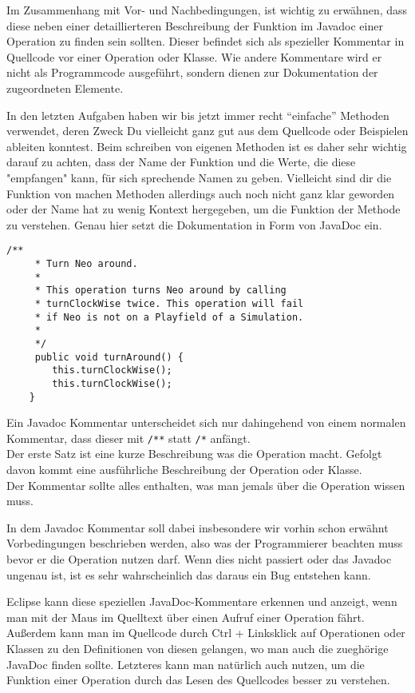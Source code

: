 \begin{Infobox}[Javadoc]
    Im Zusammenhang mit Vor- und Nachbedingungen, ist wichtig zu erwähnen, dass diese neben einer detaillierteren Beschreibung der Funktion im Javadoc einer Operation zu finden sein sollten.
    Dieser befindet sich als spezieller Kommentar in Quellcode vor einer Operation oder Klasse.
    Wie andere Kommentare wird er nicht als Programmcode ausgeführt, sondern dienen zur Dokumentation der zugeordneten Elemente.

    In den letzten Aufgaben haben wir bis jetzt immer recht \enquote{einfache} Methoden verwendet, deren Zweck Du vielleicht ganz gut aus dem Quellcode oder Beispielen ableiten konntest.
    Beim schreiben von eigenen Methoden ist es daher sehr wichtig darauf zu achten, dass der Name der Funktion und die Werte, die diese "empfangen" kann, für sich sprechende Namen zu geben.
    Vielleicht sind dir die Funktion von machen Methoden allerdings auch noch nicht ganz klar geworden oder der Name hat zu wenig Kontext hergegeben, um die Funktion der Methode
zu verstehen.
    Genau hier setzt die Dokumentation in Form von JavaDoc ein.

    \begin{lstlisting}[numbers=none]
    /**
     * Turn Neo around.
     *
     * This operation turns Neo around by calling
     * turnClockWise twice. This operation will fail 
     * if Neo is not on a Playfield of a Simulation.
     *
     */
     public void turnAround() {
        this.turnClockWise();
        this.turnClockWise();
    }
    \end{lstlisting}

    Ein Javadoc Kommentar unterscheidet sich nur dahingehend von einem normalen Kommentar, dass dieser mit \lstinline{/**} statt \lstinline{/*} anfängt.\\
    
    Der erste Satz ist eine kurze Beschreibung was die Operation macht.
    Gefolgt davon kommt eine ausführliche Beschreibung der Operation oder Klasse.\\

    Der Kommentar sollte alles enthalten, was man jemals über die Operation wissen muss.

    In dem Javadoc Kommentar soll dabei insbesondere wir vorhin schon erwähnt Vorbedingungen beschrieben werden, also was der Programmierer beachten muss bevor er die Operation nutzen darf.
    Wenn dies nicht passiert oder das Javadoc ungenau ist, ist es sehr wahrscheinlich das daraus ein Bug entstehen kann.

    Eclipse kann diese speziellen JavaDoc-Kommentare erkennen und anzeigt, wenn man mit der Maus im Quelltext über einen Aufruf einer Operation fährt.
    Außerdem kann man im Quellcode durch Ctrl + Linksklick auf Operationen oder Klassen zu den Definitionen von diesen gelangen, wo man auch die zueghörige JavaDoc finden sollte.
    Letzteres kann man natürlich auch nutzen, um die Funktion einer Operation durch das Lesen des Quellcodes besser zu verstehen.

\end{Infobox}

